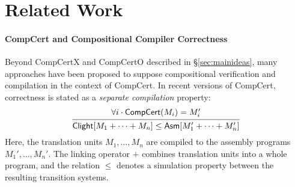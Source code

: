 \documentclass[acmsmall,review,anonymous]{acmart}\settopmatter{printfolios=true,printccs=false,printacmref=false}
\begin{document}



\section{Related Work} %

\paragraph{CompCert and Compositional Compiler Correctness}

Beyond CompCertX and CompCertO
described in \S\ref{sec:mainideas},
many approaches have been proposed
to suppose compositional verification and compilation
in the context of CompCert.
%
In recent versions of CompCert,
correctness is stated as
a \emph{separate compilation} \cite{sepcompcert} property:
\begin{equation} \label{eqn:scc}
  \begin{prooftree}
    \hypo{\forall i \cdot \kw{CompCert}(M_i) = M_i'}
    \infer1{\kw{Clight}[M_1 + \cdots + M_n]
      \le \kw{Asm}[M_1' + \cdots + M_n']}
  \end{prooftree}
\end{equation}
Here,
the translation units $M_1, \ldots, M_n$
are compiled to the assembly programs $M_1', \ldots, M_n'$.
The linking operator $+$
combines translation units into a whole program,
and the relation $\le$ denotes a simulation property
between the resulting transition systems.
\end{document}

